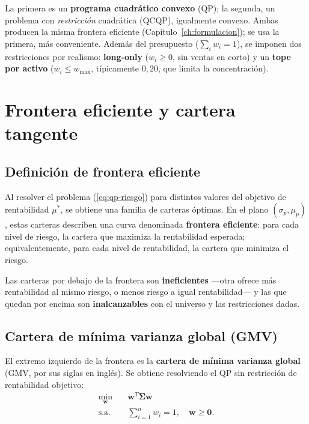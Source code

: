 La primera es un \textbf{programa cuadrático convexo} (QP); la segunda, un
problema con \emph{restricción} cuadrática (QCQP), igualmente convexo. Ambas
producen la misma frontera eficiente (Capítulo~\ref{ch:formulacion}); se usa la
primera, más conveniente. Además del presupuesto ($\sum_i w_i = 1$), se imponen
dos restricciones por realismo: \textbf{long-only} ($w_i \ge 0$, sin ventas en
corto) y un \textbf{tope por activo} ($w_i \le w_{\max}$, típicamente $0{,}20$,
que limita la concentración).

\section{Frontera eficiente y cartera tangente}

\subsection{Definición de frontera eficiente}

Al resolver el problema (\ref{eq:qp-riesgo}) para distintos valores
del objetivo de rentabilidad $\mu^*$, se obtiene una familia de carteras
óptimas. En el
plano $(\sigma_p, \mu_p)$, estas carteras describen una curva denominada
\textbf{frontera eficiente}: para cada nivel de riesgo, la cartera que
maximiza la rentabilidad esperada; equivalentemente, para cada nivel de
rentabilidad, la cartera que minimiza el riesgo.

Las carteras por debajo de la frontera son \textbf{ineficientes} ---otra ofrece
más rentabilidad al mismo riesgo, o menos riesgo a igual rentabilidad--- y las
que quedan por encima son \textbf{inalcanzables} con el universo y las
restricciones dadas.

\subsection{Cartera de mínima varianza global (GMV)}

El extremo izquierdo de la frontera es la \textbf{cartera de mínima
varianza global} (GMV, por sus siglas en inglés). Se obtiene resolviendo
el QP sin restricción de rentabilidad objetivo:
\begin{equation}
    \begin{aligned}
        \min_{\mathbf{w}} \quad & \mathbf{w}^T \boldsymbol{\Sigma}
            \mathbf{w} \\
        \text{s.a.} \quad & \sum_{i=1}^{n} w_i = 1, \quad
            \mathbf{w} \ge \mathbf{0}.
    \end{aligned}
    \label{eq:gmv}
\end{equation}

